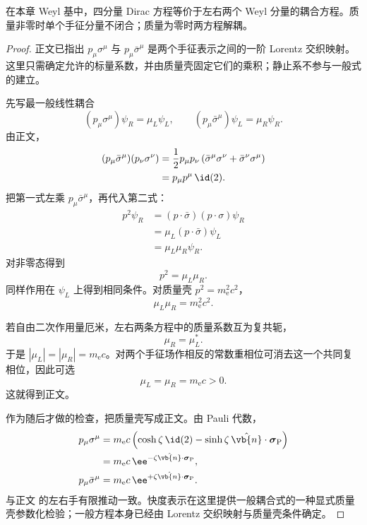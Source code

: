 \begin{proposition}
在本章 Weyl 基中，四分量 Dirac 方程等价于左右两个 Weyl 分量的耦合方程。质量非零时单个手征分量不闭合；质量为零时两方程解耦。
\end{proposition}

\begin{proof}
正文已指出 $p_\mu\sigma^\mu$ 与 $p_\mu\bar\sigma^\mu$ 是两个手征表示之间的一阶 Lorentz 交织映射。这里只需确定允许的标量系数，并由质量壳固定它们的乘积；静止系不参与一般式的建立。

先写最一般线性耦合
\begin{equation*}
 (p_\mu\sigma^\mu)\psi_R=\mu_L\psi_L,
 \qquad
 (p_\mu\bar\sigma^\mu)\psi_L=\mu_R\psi_R.
\end{equation*}
由正文，
\begin{align*}
 (p_\mu\bar\sigma^\mu)(p_\nu\sigma^\nu)
 &=\frac12p_\mu p_\nu
 \left(\bar\sigma^\mu\sigma^\nu+\bar\sigma^\nu\sigma^\mu\right)\\
 &=p_\mu p^\mu\,\id(2).
\end{align*}
把第一式左乘 $p_\mu\bar\sigma^\mu$，再代入第二式：
\begin{align*}
 p^2\psi_R
 &=(p\!\cdot\!\bar\sigma)(p\!\cdot\!\sigma)\psi_R\\
 &=\mu_L(p\!\cdot\!\bar\sigma)\psi_L\\
 &=\mu_L\mu_R\psi_R.
\end{align*}
对非零态得到
\begin{equation*}
 p^2=\mu_L\mu_R.
\end{equation*}
同样作用在 $\psi_L$ 上得到相同条件。对质量壳 $p^2=m_{\mathrm e}^2c^2$，
\begin{equation*}
 \mu_L\mu_R=m_{\mathrm e}^2c^2.
\end{equation*}

若自由二次作用量厄米，左右两条方程中的质量系数互为复共轭，
\begin{equation*}
 \mu_R=\mu_L^*.
\end{equation*}
于是 $|\mu_L|=|\mu_R|=m_{\mathrm e} c$。对两个手征场作相反的常数重相位可消去这一个共同复相位，因此可选
\begin{equation*}
 \mu_L=\mu_R=m_{\mathrm e} c>0.
\end{equation*}
这就得到正文。

作为随后才做的检查，把质量壳写成正文。由 Pauli 代数，
\begin{align*}
 p_\mu\sigma^\mu
 &=m_{\mathrm e} c\left(\cosh\zeta\,\id(2)
 -\sinh\zeta\,\hat{\vb{n}}\cdot\boldsymbol\sigma_{\rm P}\right)\\
 &=m_{\mathrm e} c\,\ee^{-\zeta\hat{\vb{n}}\cdot\boldsymbol\sigma_{\rm P}},\\
 p_\mu\bar\sigma^\mu
 &=m_{\mathrm e} c\,\ee^{+\zeta\hat{\vb{n}}\cdot\boldsymbol\sigma_{\rm P}}.
\end{align*}
与正文 的左右手有限推动一致。快度表示在这里提供一般耦合式的一种显式质量壳参数化检验；一般方程本身已经由 Lorentz 交织映射与质量壳条件确定。
\end{proof}

